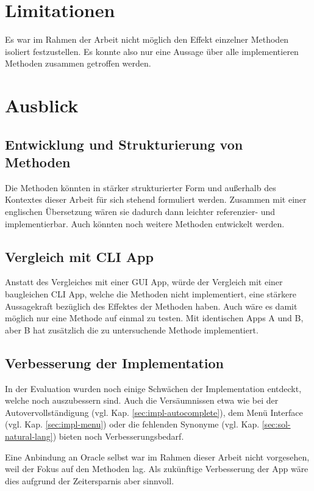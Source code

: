 \documentclass[oneside,bibliography=totocnumbered,BCOR=5mm]{scrbook}
\begin{document}
\section{Limitationen}

Es war im Rahmen der Arbeit nicht möglich den Effekt einzelner Methoden isoliert
festzustellen. Es konnte also nur eine Aussage über alle implementieren Methoden
zusammen getroffen werden.

\section{Ausblick}
\subsection{Entwicklung und Strukturierung von Methoden}

Die Methoden könnten in stärker strukturierter Form und außerhalb des Kontextes
dieser Arbeit für sich stehend formuliert werden. Zusammen mit einer englischen
Übersetzung wären sie dadurch dann leichter referenzier- und implementierbar.
Auch könnten noch weitere Methoden entwickelt werden.

\subsection{Vergleich mit CLI App}

Anstatt des Vergleiches mit einer GUI App, würde der Vergleich mit einer
baugleichen CLI App, welche die Methoden nicht implementiert, eine stärkere
Aussagekraft bezüglich des Effektes der Methoden haben. Auch wäre es damit
möglich nur eine Methode auf einmal zu testen. Mit identischen Apps A und B,
aber B hat zusätzlich die zu untersuchende Methode implementiert.

\subsection{Verbesserung der Implementation}

In der Evaluation wurden noch einige Schwächen der Implementation entdeckt,
welche noch auszubessern sind. Auch die Versäumnissen etwa wie bei der
Autovervollständigung (vgl. Kap. \ref{sec:impl-autocomplete}), dem Menü
Interface (vgl. Kap. \ref{sec:impl-menu}) oder die fehlenden Synonyme (vgl. Kap.
\ref{sec:sol-natural-lang}) bieten noch Verbesserungsbedarf.

Eine Anbindung an Oracle selbst war im Rahmen dieser Arbeit nicht vorgesehen,
weil der Fokus auf den Methoden lag. Als zukünftige Verbesserung der App wäre
dies aufgrund der Zeitersparnis aber sinnvoll.
\end{document}
